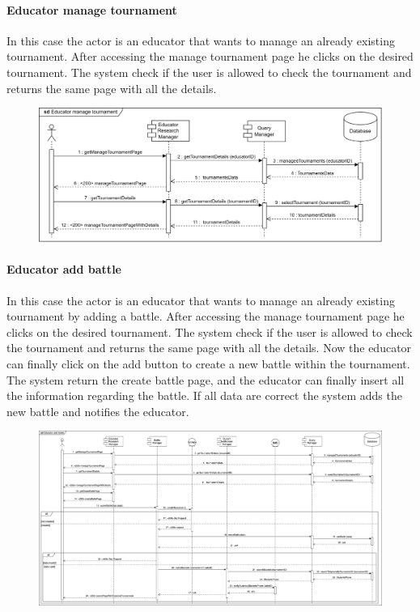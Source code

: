 \documentclass[12pt, a4paper]{report}
\begin{document}
    \paragraph*{Educator manage tournament}
    In this case the actor is an educator that wants to manage an already existing tournament. 
    After accessing the manage tournament page he clicks on the desired tournament. 
    The system check if the user is allowed to check the tournament and returns the same page with all the details. 
    \begin{figure}[H]
        \centering
        \includegraphics[width=1.0\linewidth]{images/emtrv.png}
    \end{figure}

    \paragraph*{Educator add battle}
    In this case the actor is an educator that wants to manage an already existing tournament by adding a battle. 
    After accessing the manage tournament page he clicks on the desired tournament. 
    The system check if the user is allowed to check the tournament and returns the same page with all the details. 
    Now the educator can finally click on the add button to create a new battle within the tournament. 
    The system return the create battle page, and the educator can finally insert all the information regarding the battle. 
    If all data are correct the system adds the new battle and notifies the educator. 
    \begin{figure}[H]
        \centering
        \includegraphics[width=1.0\linewidth]{images/eabrv.png}
    \end{figure}
\end{document}
